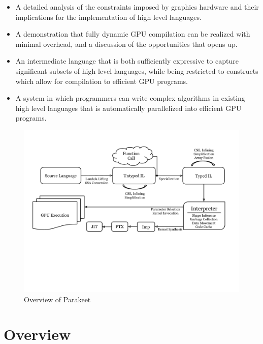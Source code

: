 \documentclass[preprint]{sigplanconf}
\begin{document}
\begin{itemize}
\item A detailed analysis of the constraints imposed by graphics hardware and their implications for the implementation of high level languages.

\item A demonstration that fully dynamic GPU compilation can be realized with minimal overhead, and a discussion of the opportunities that opens up.

\item An intermediate language that is both sufficiently expressive to capture significant subsets of high level languages, while being restricted to constructs which allow for compilation to efficient GPU programs.

\item A system in which programmers can write complex algorithms in existing high level languages that is automatically parallelized into efficient GPU programs.
\end{itemize}

\begin{figure}[t!bh]
\begin{center}
\leavevmode
\includegraphics[scale=0.6, trim=10pt 180pt 10pt 120pt]{Pipeline.pdf}
\end{center}
\caption{Overview of Parakeet}
\label{fig:overview}
\end{figure}
\section{Overview}
\label{overview}
\end{document}
